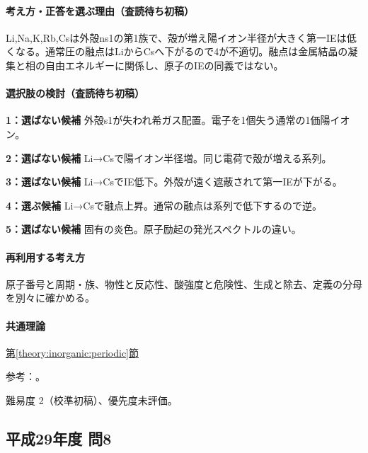 \paragraph{考え方・正答を選ぶ理由（査読待ち初稿）} Li,Na,K,Rb,Csは外殻ns1の第1族で、殻が増え陽イオン半径が大きく第一IEは低くなる。通常圧の融点はLiからCsへ下がるので4が不適切。融点は金属結晶の凝集と相の自由エネルギーに関係し、原子のIEの同義ではない。

\paragraph{選択肢の検討（査読待ち初稿）}\mbox{}\par

\noindent\textbf{1：選ばない候補} 外殻s1が失われ希ガス配置。電子を1個失う通常の1価陽イオン。\par

\noindent\textbf{2：選ばない候補} Li→Csで陽イオン半径増。同じ電荷で殻が増える系列。\par

\noindent\textbf{3：選ばない候補} Li→CsでIE低下。外殻が遠く遮蔽されて第一IEが下がる。\par

\noindent\textbf{4：選ぶ候補} Li→Csで融点上昇。通常の融点は系列で低下するので逆。\par

\noindent\textbf{5：選ばない候補} 固有の炎色。原子励起の発光スペクトルの違い。\par

\paragraph{再利用する考え方} 原子番号と周期・族、物性と反応性、酸強度と危険性、生成と除去、定義の分母を別々に確かめる。

\paragraph{共通理論} \hyperref[theory:inorganic:periodic]{第\ref*{theory:inorganic:periodic}節}

\par 参考：\cite{inorganic_alkali,atomic_nist2019}。

\par 難易度 2（校準初稿）、優先度未評価。

\subsection{平成29年度 問8}
\label{q:h29-reg-applied-08}

